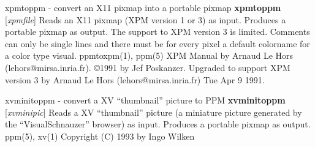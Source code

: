 %

\newpage
%

xpmtoppm - convert an X11 pixmap into a portable pixmap
{\bf xpmtoppm}
{\rm [}{\it xpmfile}{\rm ]}
Reads an X11 pixmap (XPM version 1 or 3) as input.
Produces a portable pixmap as output.
The support to XPM version 3 is limited. Comments can only be single lines
and there must be for every pixel a default colorname for a color type visual.
ppmtoxpm(1), ppm(5)
\nwl
XPM Manual by Arnaud Le Hors (lehors@mirsa.inria.fr).
\copyright 1991 by Jef Poskanzer.
Upgraded to support XPM version 3 by Arnaud Le Hors
(lehors@mirsa.inria.fr) Tue Apr 9 1991.
%
 
%

\newpage
%

xvminitoppm - convert a XV ``thumbnail'' picture to PPM
{\bf xvminitoppm}
{\rm [}{\it xvminipic}{\rm ]}
Reads a XV ``thumbnail'' picture (a miniature picture generated by
the ``VisualSchnauzer'' browser) as input.
Produces a portable pixmap as output.
ppm(5), xv(1)
Copyright (C) 1993 by Ingo Wilken
%

